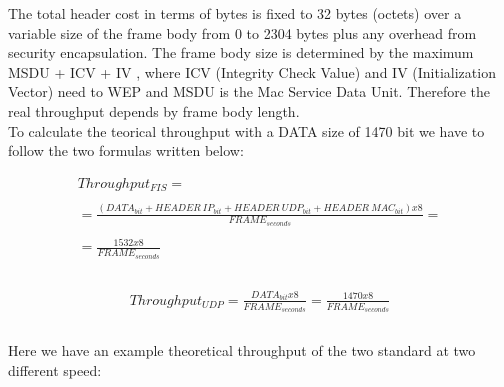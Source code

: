 	The total header cost in terms of bytes is fixed to 32 bytes (octets) over a variable size of the frame body from 0 to 2304 bytes plus any overhead from security encapsulation. The frame body size is determined by the maximum MSDU + ICV + IV , where ICV (Integrity Check Value) and IV (Initialization Vector) need to WEP and MSDU is the Mac Service Data Unit. Therefore the real throughput depends by frame body length.\\
	
	
	To calculate the teorical throughput with a DATA size of 1470 bit we have to follow the two formulas written below:
	
	\begin{gather*}
		Throughput_{FIS} = \\\\
		= \frac{ ( DATA_{bit} + HEADER\ IP_{bit} + HEADER\ UDP_{bit} + HEADER\ MAC_{bit} ) x 8 }{ FRAME_{seconds} } = \\\\
		= \frac{ 1532 x 8 }{  FRAME_{seconds} } \\\\
	\end{gather*}
	
	\begin{gather*}
		Throughput_{UDP} = \frac{ DATA_{bit} x 8 }{ FRAME_{seconds} } = \frac{ 1470 x 8 }{  FRAME_{seconds} } \\\\
	\end{gather*}
	
	Here we have an example theoretical throughput of the two standard at two different speed:
	
